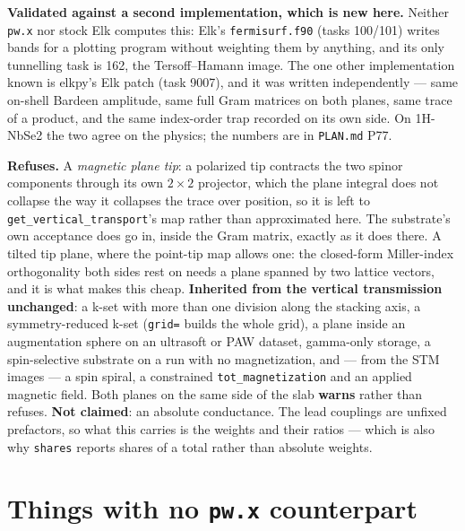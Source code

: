\documentclass[11pt,a4paper]{article}
\newcommand{\code}[1]{\texttt{\small #1}}
\begin{document}
\textbf{Validated against a second implementation, which is new here.} Neither
\code{pw.x} nor stock Elk computes this: Elk's \code{fermisurf.f90} (tasks
100/101) writes bands for a plotting program without weighting them by
anything, and its only tunnelling task is 162, the Tersoff--Hamann image. The
one other implementation known is elkpy's Elk patch (task 9007), and it was
written independently --- same on-shell Bardeen amplitude, same full Gram
matrices on both planes, same trace of a product, and the same index-order trap
recorded on its own side. On 1H-NbSe2 the two agree on the physics; the numbers
are in \code{PLAN.md} P77.

\begin{refuses}
\textbf{Refuses.} A \emph{magnetic plane tip}: a polarized tip contracts the two
spinor components through its own $2\times2$ projector, which the plane integral
does not collapse the way it collapses the trace over position, so it is left to
\code{get\_vertical\_transport}'s map rather than approximated here. The
substrate's own acceptance does go in, inside the Gram matrix, exactly as it
does there. A tilted tip plane, where the point-tip map allows one: the
closed-form Miller-index orthogonality both sides rest on needs a plane spanned
by two lattice vectors, and it is what makes this cheap.
\textbf{Inherited from the vertical transmission unchanged}: a k-set with more
than one division along the stacking axis, a symmetry-reduced k-set
(\code{grid=} builds the whole grid), a plane inside an augmentation sphere on
an ultrasoft or PAW dataset, gamma-only storage, a spin-selective substrate on a
run with no magnetization, and --- from the STM images --- a spin spiral, a
constrained \code{tot\_magnetization} and an applied magnetic field. Both planes
on the same side of the slab \textbf{warns} rather than refuses.
\textbf{Not claimed}: an absolute conductance. The lead couplings are unfixed
prefactors, so what this carries is the weights and their ratios --- which is
also why \code{shares} reports shares of a total rather than absolute weights.
\end{refuses}

\section{Things with no \texorpdfstring{\code{pw.x}}{pw.x} counterpart}
\end{document}

